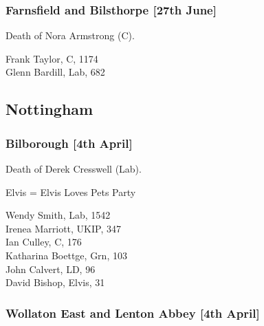 \documentclass[a4paper,openany,10pt]{book}
\begin{document}
\subsubsection*{Farnsfield and Bilsthorpe \hspace*{\fill}\nolinebreak[1]%
\enspace\hspace*{\fill}
[27th June]}


Death of Nora Armstrong (C).



Frank Taylor, C, 1174\\
Glenn Bardill, Lab, 682\\


\subsection*{Nottingham}

\subsubsection*{Bilborough \hspace*{\fill}\nolinebreak[1]%
\enspace\hspace*{\fill}
[4th April]}


Death of Derek Cresswell (Lab).

Elvis = Elvis Loves Pets Party



Wendy Smith, Lab, 1542\\
Irenea Marriott, UKIP, 347\\
Ian Culley, C, 176\\
Katharina Boettge, Grn, 103\\
John Calvert, LD, 96\\
David Bishop, Elvis, 31\\


\subsubsection*{Wollaton East and Lenton Abbey \hspace*{\fill}\nolinebreak[1]%
\enspace\hspace*{\fill}
[4th April]}
\end{document}
